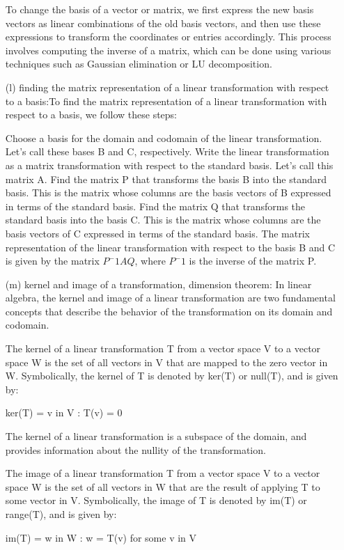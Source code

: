 \documentclass[fontsize=12pt]{scrartcl}
\begin{document}
\begin{itemize}
To change the basis of a vector or matrix, we first express the new basis vectors as linear combinations of the old basis vectors, and then use these expressions to transform the coordinates or entries accordingly. This process involves computing the inverse of a matrix, which can be done using various techniques such as Gaussian elimination or LU decomposition.
    \item[(l)] finding the matrix representation of a linear transformation with respect to a basis:To find the matrix representation of a linear transformation with respect to a basis, we follow these steps:

Choose a basis for the domain and codomain of the linear transformation. Let's call these bases B and C, respectively.
Write the linear transformation as a matrix transformation with respect to the standard basis. Let's call this matrix A.
Find the matrix P that transforms the basis B into the standard basis. This is the matrix whose columns are the basis vectors of B expressed in terms of the standard basis.
Find the matrix Q that transforms the standard basis into the basis C. This is the matrix whose columns are the basis vectors of C expressed in terms of the standard basis.
The matrix representation of the linear transformation with respect to the basis B and C is given by the matrix $P^-1AQ$, where $P^-1$ is the inverse of the matrix P.
    \item[(m)] kernel and image of a transformation, dimension theorem: In linear algebra, the kernel and image of a linear transformation are two fundamental concepts that describe the behavior of the transformation on its domain and codomain.

The kernel of a linear transformation T from a vector space V to a vector space W is the set of all vectors in V that are mapped to the zero vector in W. Symbolically, the kernel of T is denoted by ker(T) or null(T), and is given by:

ker(T) = {v in V : T(v) = 0}

The kernel of a linear transformation is a subspace of the domain, and provides information about the nullity of the transformation.

The image of a linear transformation T from a vector space V to a vector space W is the set of all vectors in W that are the result of applying T to some vector in V. Symbolically, the image of T is denoted by im(T) or range(T), and is given by:

im(T) = {w in W : w = T(v) for some v in V}


\end{itemize}
\end{document}

